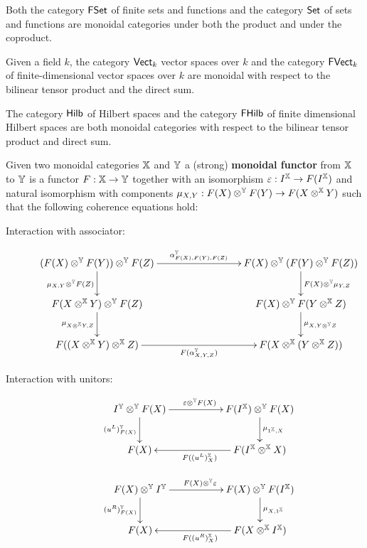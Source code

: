 \begin{example}
Both the category $\mathsf{FSet}$ of finite sets and functions and the category $\mathsf{Set}$ of sets and functions are monoidal categories under both the product and under the coproduct.

Given a field $k$, the category $\mathsf{Vect}_k$ vector spaces over $k$  and the category $\mathsf{FVect}_k$ of finite-dimensional vector spaces over $k$ are monoidal with respect to the bilinear tensor product and the direct sum.

The category $\mathsf{Hilb}$ of Hilbert spaces and the category $\mathsf{FHilb}$ of finite dimensional Hilbert spaces are both monoidal categories with respect to the bilinear tensor product and direct sum.
\end{example}



\begin{definition}
Given two monoidal categories $\mathbb{X}$ and $\mathbb{Y}$ a (strong) {\bf monoidal functor} from $\mathbb{X}$ to $\mathbb{Y}$ is a functor $F:\mathbb{X}\to \mathbb{Y}$ together with an isomorphism $\varepsilon:I^{\mathbb{X}} \to F(I^{\mathbb{X}})$ and natural isomorphism with components $\mu_{X,Y}:F(X)\otimes^{\mathbb{Y}} F(Y) \to F(X \otimes^{\mathbb{X}} Y)$ such that the following coherence equations hold:

\begin{description}

\item[Interaction with associator:]

$$
\xymatrix{
 (F(X)\otimes^\Y F(Y))\otimes^\Y F(Z) \ar[rrr]^{\alpha_{F(X),F(Y),F(Z)}^{\Y}} \ar[d]_{\mu_{X,Y}\otimes^\Y F(Z)}
   &&& F(X) \otimes^\Y (F(Y)\otimes^\Y F(Z)) \ar[d]^{F(X)\otimes^\Y \mu_{Y,Z}}
 \\F(X\otimes^\X Y)\otimes^\Y F(Z) \ar[d]_{\mu_{X\otimes^\X Y,Z}}
   &&& F(X)\otimes^\Y F(Y\otimes^\X Z) \ar[d]^{\mu_{X,Y\otimes^\Y Z}}
 \\ F((X\otimes^\X Y) \otimes^\X Z) \ar[rrr]_{F(\alpha_{X,Y,Z}^\Y)}
   &&& F(X\otimes^\X (Y\otimes^\X Z))
}
$$

\item[Interaction with unitors:]
$$
\xymatrix{
 I^\Y \otimes^\Y F(X) \ar[rr]^{\epsilon \otimes^\Y F(X)} \ar[d]_{(u^L)^\Y_{F(X)}}
  &&  F(I^\X) \otimes^\Y F(X) \ar[d]^{\mu_{1^\X,X}}
\\F(X)
 & & F(I^\X\otimes^\X X) \ar[ll]^{F((u^L)^\X_{X} )}
}
$$


$$
\xymatrix{
  F(X)  \otimes^\Y I^\Y \ar[rr]^{ F(X)  \otimes^\Y \epsilon} \ar[d]_{(u^R)^\Y_{F(X)}}
  && F(X) \otimes^\Y    F(I^\X)  \ar[d]^{\mu_{X,1^\X}}
\\F(X)
 & & F(X \otimes^\X I^\X ) \ar[ll]^{F((u^R)^\X_{X} )}
}
$$
\end{description}



\end{definition}
